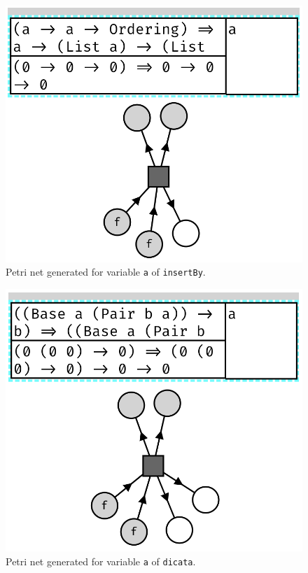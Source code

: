 \documentclass[11pt,openright,hidelinks,a4paper]{article}
\begin{document}
\begin{figure}[H]
\begin{center}
\includegraphics[scale=0.45]{insertBy}
\end{center}
\caption{Petri net generated for variable \lstinline{a} of \lstinline{insertBy}.}
\label{fig:insertBy}
\end{figure}

\begin{figure}[H]
\begin{center}
\includegraphics[scale=0.45]{dicata}
\end{center}
\caption{Petri net generated for variable \lstinline{a} of \lstinline{dicata}.}
\label{fig:dicata}
\end{figure}
\end{document}

